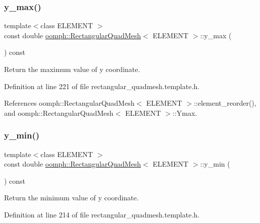 \subsubsection{\texorpdfstring{y\+\_\+max()}{y\_max()}}
{\footnotesize\ttfamily template$<$class E\+L\+E\+M\+E\+NT $>$ \\
const double \hyperlink{classoomph_1_1RectangularQuadMesh}{oomph\+::\+Rectangular\+Quad\+Mesh}$<$ E\+L\+E\+M\+E\+NT $>$\+::y\+\_\+max (\begin{DoxyParamCaption}{ }\end{DoxyParamCaption}) const\hspace{0.3cm}{\ttfamily [inline]}}



Return the maximum value of y coordinate. 



Definition at line 221 of file rectangular\+\_\+quadmesh.\+template.\+h.



References oomph\+::\+Rectangular\+Quad\+Mesh$<$ E\+L\+E\+M\+E\+N\+T $>$\+::element\+\_\+reorder(), and oomph\+::\+Rectangular\+Quad\+Mesh$<$ E\+L\+E\+M\+E\+N\+T $>$\+::\+Ymax.

\mbox{\label{classoomph_1_1RectangularQuadMesh_a1c493af1dae35746bed7a31e61b46c5b}} 
\subsubsection{\texorpdfstring{y\+\_\+min()}{y\_min()}}
{\footnotesize\ttfamily template$<$class E\+L\+E\+M\+E\+NT $>$ \\
const double \hyperlink{classoomph_1_1RectangularQuadMesh}{oomph\+::\+Rectangular\+Quad\+Mesh}$<$ E\+L\+E\+M\+E\+NT $>$\+::y\+\_\+min (\begin{DoxyParamCaption}{ }\end{DoxyParamCaption}) const\hspace{0.3cm}{\ttfamily [inline]}}



Return the minimum value of y coordinate. 



Definition at line 214 of file rectangular\+\_\+quadmesh.\+template.\+h.



